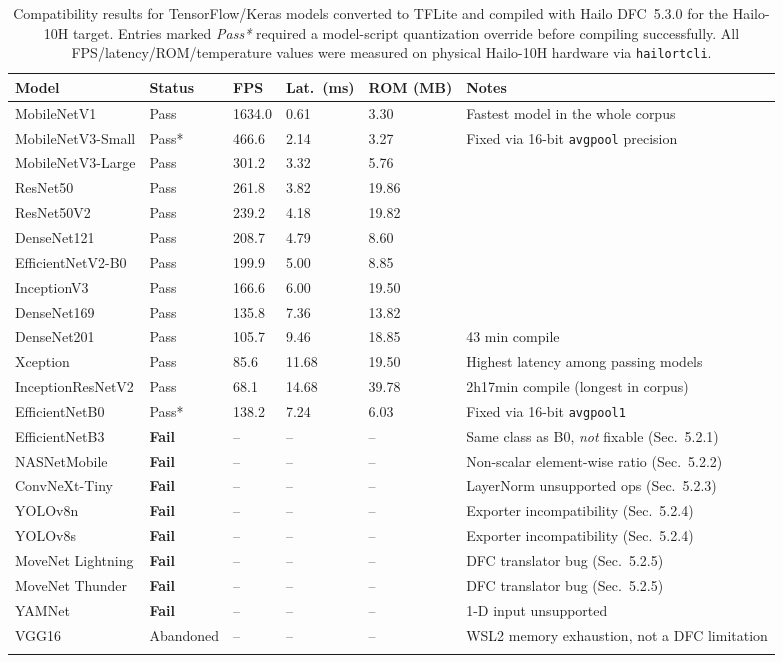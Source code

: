 \documentclass[11pt]{article}
\begin{document}
\begin{longtable}{@{}p{3.6cm}p{1.4cm}p{1.3cm}p{1.5cm}p{1.6cm}p{4.6cm}@{}}
\toprule
\textbf{Model} & \textbf{Status} & \textbf{FPS} & \textbf{Lat.\ (ms)} & \textbf{ROM (MB)} & \textbf{Notes} \\
\midrule
\endhead
MobileNetV1 & Pass & 1634.0 & 0.61 & 3.30 & Fastest model in the whole corpus \\
MobileNetV3-Small & Pass* & 466.6 & 2.14 & 3.27 & Fixed via 16-bit \texttt{avgpool} precision \\
MobileNetV3-Large & Pass & 301.2 & 3.32 & 5.76 & \\
ResNet50 & Pass & 261.8 & 3.82 & 19.86 & \\
ResNet50V2 & Pass & 239.2 & 4.18 & 19.82 & \\
DenseNet121 & Pass & 208.7 & 4.79 & 8.60 & \\
EfficientNetV2-B0 & Pass & 199.9 & 5.00 & 8.85 & \\
InceptionV3 & Pass & 166.6 & 6.00 & 19.50 & \\
DenseNet169 & Pass & 135.8 & 7.36 & 13.82 & \\
DenseNet201 & Pass & 105.7 & 9.46 & 18.85 & 43 min compile \\
Xception & Pass & 85.6 & 11.68 & 19.50 & Highest latency among passing models \\
InceptionResNetV2 & Pass & 68.1 & 14.68 & 39.78 & 2h17min compile (longest in corpus) \\
EfficientNetB0 & Pass* & 138.2 & 7.24 & 6.03 & Fixed via 16-bit \texttt{avgpool1} \\
EfficientNetB3 & \textbf{Fail} & -- & -- & -- & Same class as B0, \emph{not} fixable (Sec.~5.2.1) \\
NASNetMobile & \textbf{Fail} & -- & -- & -- & Non-scalar element-wise ratio (Sec.~5.2.2) \\
ConvNeXt-Tiny & \textbf{Fail} & -- & -- & -- & LayerNorm unsupported ops (Sec.~5.2.3) \\
YOLOv8n & \textbf{Fail} & -- & -- & -- & Exporter incompatibility (Sec.~5.2.4) \\
YOLOv8s & \textbf{Fail} & -- & -- & -- & Exporter incompatibility (Sec.~5.2.4) \\
MoveNet Lightning & \textbf{Fail} & -- & -- & -- & DFC translator bug (Sec.~5.2.5) \\
MoveNet Thunder & \textbf{Fail} & -- & -- & -- & DFC translator bug (Sec.~5.2.5) \\
YAMNet & \textbf{Fail} & -- & -- & -- & 1-D input unsupported \\
VGG16 & Abandoned & -- & -- & -- & WSL2 memory exhaustion, not a DFC limitation \\
\bottomrule
\caption{Compatibility results for TensorFlow/Keras models converted to TFLite
and compiled with Hailo DFC~5.3.0 for the Hailo-10H target. Entries marked
\emph{Pass*} required a model-script quantization override before compiling
successfully. All FPS/latency/ROM/temperature values were measured on
physical Hailo-10H hardware via \texttt{hailortcli}.}
\end{longtable}
\end{document}
